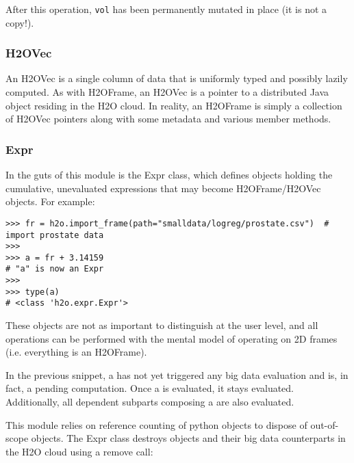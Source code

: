 After this operation, \texttt{vol} has been permanently mutated in place (it is not a copy!).




%

\subsubsection{H2OVec}

An H2OVec is a single column of data that is uniformly typed and possibly lazily computed. As with H2OFrame, an H2OVec is a pointer to a distributed Java object residing in the H2O cloud. In reality, an H2OFrame is simply a collection of H2OVec pointers along with some metadata and various member methods.

\subsubsection{Expr}

In the guts of this module is the Expr class, which defines objects holding the cumulative, unevaluated expressions that may become H2OFrame/H2OVec objects. For example:

\begin{lstlisting}[style=python]
>>> fr = h2o.import_frame(path="smalldata/logreg/prostate.csv")  # import prostate data
>>>
>>> a = fr + 3.14159                         
# "a" is now an Expr
>>>
>>> type(a)                                        
# <class 'h2o.expr.Expr'>
\end{lstlisting}

These objects are not as important to distinguish at the user level, and all operations can be performed with the mental model of operating on 2D frames (i.e. everything is an H2OFrame).

In the previous snippet, a has not yet triggered any big data evaluation and is, in fact, a pending computation. Once a is evaluated, it stays evaluated. Additionally, all dependent subparts composing a are also evaluated.

This module relies on reference counting of python objects to dispose of out-of-scope objects. The Expr class destroys objects and their big data counterparts in the H2O cloud using a remove call:

